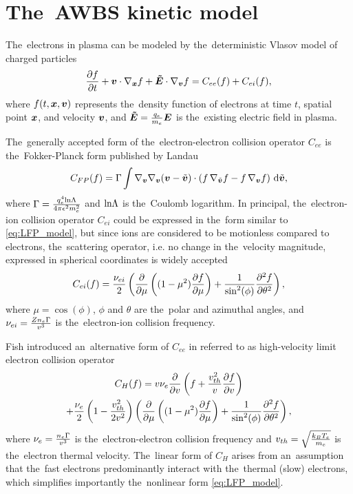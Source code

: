 \section{The~AWBS kinetic model}
\label{sec:AWBSmodel}

The~electrons in plasma can be modeled by the~deterministic Vlasov model 
of charged particles
\begin{equation}
  \frac{\partial{f}}{\partial{t}} + \boldsymbol{v}\cdot\nabla_{\boldsymbol{x}} f + \boldsymbol{\tilde{E}} \cdot\nabla_{\boldsymbol{v}} f = C_{ee}(f) + C_{ei}(f) ,
  \label{eq:kinetic_equation}
\end{equation}
where $f(t, \boldsymbol{x}, \boldsymbol{v})$ represents the~density function of electrons
at time $t$, spatial point $\boldsymbol{x}$, and velocity $\boldsymbol{v}$, and 
$\boldsymbol{\tilde{E}} = \frac{q_e}{m_e}\boldsymbol{E}$ is the~existing electric field in plasma.

The~generally accepted form of the~electron-electron collision operator 
$C_{ee}$ is the~Fokker-Planck form published by Landau \cite{Landau_1936}
\begin{equation}
  C_{FP}(f) =
  \Gamma\int \nabla_{\boldsymbol{v}}\nabla_{\boldsymbol{v}}(\boldsymbol{v} - \tilde{\boldsymbol{v}}) \cdot \left(
  f\, \nabla_{\tilde{\boldsymbol{v}}} f - f\, \nabla_{\boldsymbol{v}} f \right)\, \text{d}\tilde{\boldsymbol{v}} ,
  \label{eq:LFP_model}
\end{equation}
where $\Gamma = \frac{q_e^4\text{ln}\Lambda}{4\pi\epsilon^2m_e^2}$ and 
$\text{ln}\Lambda$ is the~Coulomb logarithm.
In principal, the~electron-ion collision operator $C_{ei}$ could be expressed
in the~form similar to \eqref{eq:LFP_model}, but since ions are considered 
to be motionless compared to electrons, the~scattering operator, i.e.
no change in the~velocity magnitude, expressed in spherical coordinates
is widely accepted
\begin{equation}
  C_{ei}(f) = \frac{\nu_{ei}}{2}
  \left(\frac{\partial{}}{\partial{\mu}}\left((1 - \mu^2)\frac{\partial{f}}{\partial{\mu}}\right)
  + \frac{1}{\sin^2(\phi)}\frac{\partial^2 f}{\partial\theta^2} \right) ,
  \label{eq:ei_scattering}
\end{equation}
where $\mu = \cos(\phi)$, $\phi$ and $\theta$ are the~polar and azimuthal 
angles, and $\nu_{ei} = \frac{Z n_e \Gamma}{v^3}$ is the~electron-ion
collision frequency.

Fish introduced an~alternative form of $C_{ee}$ in \cite{Fish_RMP1987} 
referred to as high-velocity limit electron collision operator
\begin{multline}
  C_{H}(f) = v \nu_{e} \frac{\partial{}}{\partial{v}}\left(f + 
  \frac{v_{th}^2}{v}\frac{\partial{f}}{\partial{v}}\right) \\
  + \frac{\nu_{e}}{2}\left( 1 - \frac{v_{th}^2}{2v^2}\right) 
  \left(\frac{\partial{}}{\partial{\mu}}\left((1 - \mu^2)\frac{\partial{f}}{\partial{\mu}}\right)
  + \frac{1}{\sin^2(\phi)}\frac{\partial^2f}{\partial\theta^2} \right)
  , \label{eq:HighVelocity_model}
\end{multline}
where $\nu_{e} = \frac{n_e \Gamma}{v^3}$ is the~electron-electron collision 
frequency and $v_{th} = \sqrt{\frac{k_B T_e}{m_e}}$ is the~electron thermal 
velocity.
The~linear form of $C_{H}$ arises from an~assumption that the~fast electrons 
predominantly interact with the~thermal (slow) electrons, 
which simplifies importantly the~nonlinear form \eqref{eq:LFP_model}.

